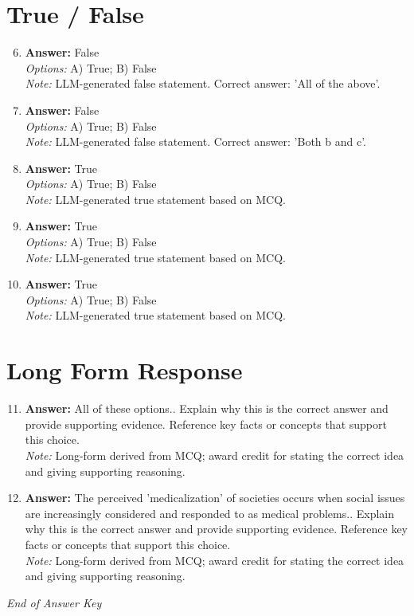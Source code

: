 \documentclass[12pt]{article}
\begin{document}
\section*{True / False}
\begin{enumerate}[label=\arabic*.]
\setcounter{enumi}{5}
\item \textbf{Answer:} False
\\ \textit{Options:} A) True; B) False
\\ \textit{Note:} LLM-generated false statement. Correct answer: 'All of the above'.
\item \textbf{Answer:} False
\\ \textit{Options:} A) True; B) False
\\ \textit{Note:} LLM-generated false statement. Correct answer: 'Both b and c'.
\item \textbf{Answer:} True
\\ \textit{Options:} A) True; B) False
\\ \textit{Note:} LLM-generated true statement based on MCQ.
\item \textbf{Answer:} True
\\ \textit{Options:} A) True; B) False
\\ \textit{Note:} LLM-generated true statement based on MCQ.
\item \textbf{Answer:} True
\\ \textit{Options:} A) True; B) False
\\ \textit{Note:} LLM-generated true statement based on MCQ.
\end{enumerate}

\section*{Long Form Response}
\begin{enumerate}[label=\arabic*.]
\setcounter{enumi}{10}
\item \textbf{Answer:} All of these options.. Explain why this is the correct answer and provide supporting evidence. Reference key facts or concepts that support this choice.
\\ \textit{Note:} Long-form derived from MCQ; award credit for stating the correct idea and giving supporting reasoning.
\item \textbf{Answer:} The perceived 'medicalization' of societies occurs when social issues are increasingly considered and responded to as medical problems.. Explain why this is the correct answer and provide supporting evidence. Reference key facts or concepts that support this choice.
\\ \textit{Note:} Long-form derived from MCQ; award credit for stating the correct idea and giving supporting reasoning.
\end{enumerate}

\vfill
\noindent\textit{End of Answer Key}
\end{document}
